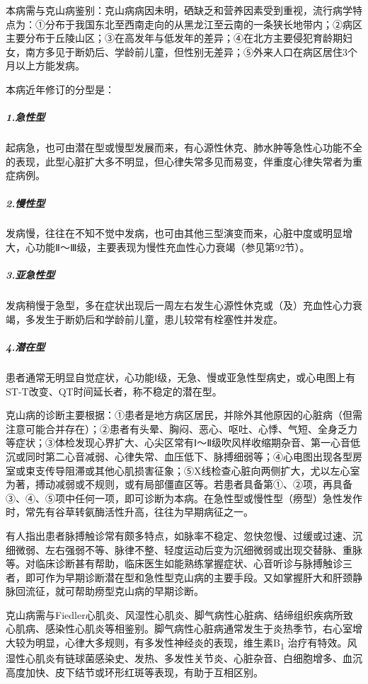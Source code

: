本病需与克山病鉴别：克山病病因未明，硒缺乏和营养因素受到重视，流行病学特点为：①分布于我国东北至西南走向的从黑龙江至云南的一条狭长地带内；②病区主要分布于丘陵山区；③在高发年与低发年的差异；④在北方主要侵犯育龄期妇女，南方多见于断奶后、学龄前儿童，但性别无差异；⑤外来人口在病区居住3个月以上方能发病。

本病近年修订的分型是：

\subparagraph{1.急性型}

起病急，也可由潜在型或慢型发展而来，有心源性休克、肺水肿等急性心功能不全的表现，此型心脏扩大多不明显，但心律失常多见而易变，伴重度心律失常者为重症病例。

\subparagraph{2.慢性型}

发病慢，往往在不知不觉中发病，也可由其他三型演变而来，心脏中度或明显增大，心功能Ⅱ～Ⅲ级，主要表现为慢性充血性心力衰竭（参见第92节）。

\subparagraph{3.亚急性型}

发病稍慢于急型，多在症状出现后一周左右发生心源性休克或（及）充血性心力衰竭，多发生于断奶后和学龄前儿童，患儿较常有栓塞性并发症。

\subparagraph{4.潜在型}

患者通常无明显自觉症状，心功能Ⅰ级，无急、慢或亚急性型病史，或心电图上有ST-T改变、QT时间延长者，称不稳定的潜在型。

克山病的诊断主要根据：①患者是地方病区居民，并除外其他原因的心脏病（但需注意可能合并存在）；②患者有头晕、胸闷、恶心、呕吐、心悸、气短、全身乏力等症状；③体检发现心界扩大、心尖区常有Ⅰ～Ⅱ级吹风样收缩期杂音、第一心音低沉或同时第二心音减弱、心律失常、血压低下、脉搏细弱等；④心电图出现各型房室或束支传导阻滞或其他心肌损害征象；⑤X线检查心脏向两侧扩大，尤以左心室为著，搏动减弱或不规则，或有局部僵直区等。若患者具备第①、②项，再具备③、④、⑤项中任何一项，即可诊断为本病。在急性型或慢性型（痨型）急性发作时，常先有谷草转氨酶活性升高，往往为早期病征之一。

有人指出患者脉搏触诊常有颇多特点，如脉率不稳定、忽快忽慢、过缓或过速、沉细微弱、左右强弱不等、脉律不整、轻度运动后变为沉细微弱或出现交替脉、重脉等。对临床诊断甚有帮助，临床医生如能熟练掌握症状、心音听诊与脉搏触诊三者，即可作为早期诊断潜在型和急性型克山病的主要手段。又如掌握肝大和肝颈静脉回流征，就可帮助痨型克山病的早期诊断。

克山病需与Fiedler心肌炎、风湿性心肌炎、脚气病性心脏病、结缔组织疾病所致心肌病、感染性心肌炎等相鉴别。脚气病性心脏病通常发生于炎热季节，右心室增大较为明显，心律大多规则，有多发性神经炎的表现，维生素B\textsubscript{1}
治疗有特效。风湿性心肌炎有链球菌感染史、发热、多发性关节炎、心脏杂音、白细胞增多、血沉高度加快、皮下结节或环形红斑等表现，有助于互相区别。

